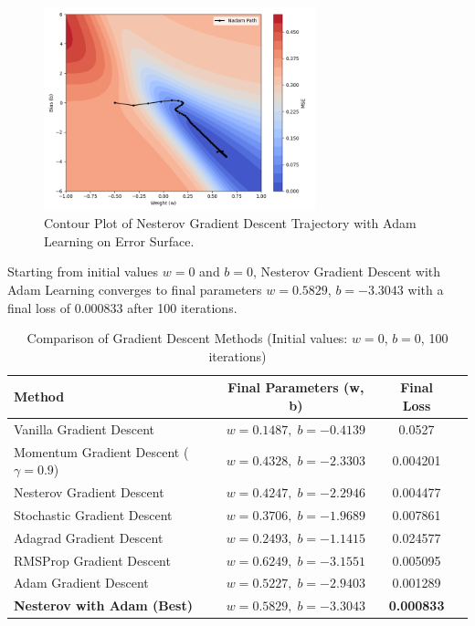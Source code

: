 \begin{figure}[h!]
    \centering
    \includegraphics[width=0.7\textwidth]{content/section01/chapter01/figs/nadam.png}
    \caption{Contour Plot of Nesterov Gradient Descent Trajectory with Adam Learning on Error Surface.}
\end{figure}

Starting from initial values \( w = 0 \) and \( b = 0 \), Nesterov Gradient Descent with Adam Learning converges to final parameters \( w = 0.5829 \), \( b = -3.3043 \) with a final loss of \( 0.000833 \) after 100 iterations.

\begin{table}[h!]
\centering
\begin{tabular}{|l|c|c|c|}
\hline
\textbf{Method} & \textbf{Final Parameters (w, b)} & \textbf{Final Loss} \\ \hline
Vanilla Gradient Descent & \( w = 0.1487,\; b = -0.4139 \) & 0.0527 \\ \hline
Momentum Gradient Descent (\( \gamma = 0.9 \)) & \( w = 0.4328,\; b = -2.3303 \) & 0.004201 \\ \hline
Nesterov Gradient Descent & \( w = 0.4247,\; b = -2.2946 \) & 0.004477 \\ \hline
Stochastic Gradient Descent & \( w = 0.3706,\; b = -1.9689 \) & 0.007861 \\ \hline
Adagrad Gradient Descent & \( w = 0.2493,\; b = -1.1415 \) & 0.024577 \\ \hline
RMSProp Gradient Descent & \( w = 0.6249,\; b = -3.1551 \) & 0.005095 \\ \hline
Adam Gradient Descent & \( w = 0.5227,\; b = -2.9403 \) & 0.001289 \\ \hline
\textbf{Nesterov with Adam (Best)} & \textbf{\( w = 0.5829,\; b = -3.3043 \)} & \textbf{0.000833} \\ \hline
\end{tabular}
\caption{Comparison of Gradient Descent Methods (Initial values: \( w = 0 \), \( b = 0 \), 100 iterations)}
\end{table}



